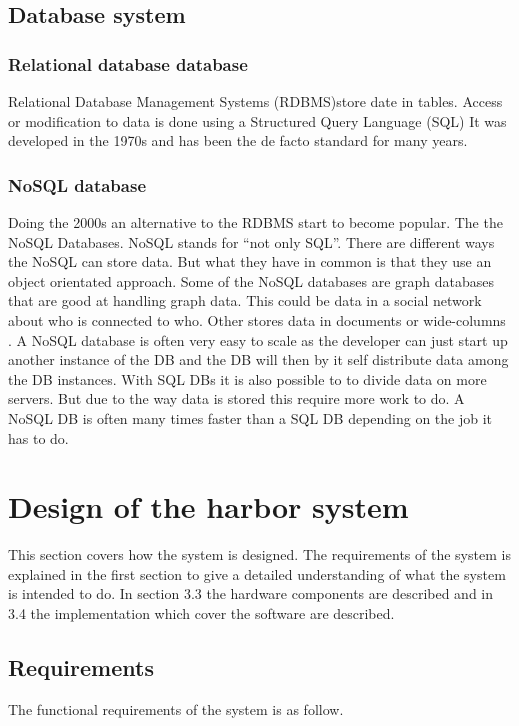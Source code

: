 \documentclass[a4paper,12pt,english]{article}
\begin{document}
\subsection{Database system}
\subsubsection{Relational database database}
Relational Database Management Systems (RDBMS)store date in tables. Access or modification to
data is done using a Structured Query Language (SQL)
It was developed in the 1970s and
has been the de facto standard for many years. 

\subsubsection{NoSQL database}
Doing the 2000s an alternative to the RDBMS start to become popular.
The the NoSQL Databases. NoSQL stands for ``not only SQL''.
There are different ways the NoSQL can store
data. But what they have in common is that they use an object orientated
approach. Some of the NoSQL databases are graph databases that are good at
handling graph data. This could be data in a social network about who is
connected to who. Other stores data in documents or wide-columns \cite{mongo}. 
A NoSQL database is often very easy to scale as the developer can just start up
another instance of the DB and the DB will then by it self distribute data among
the DB instances. With SQL DBs it is also possible to to divide data on more
servers. But due to the way data is stored this require more work to do. A NoSQL
DB is often many times faster than a SQL DB depending on the job it has to do.

\section{Design of the harbor system}
This section covers how the system is designed. The requirements of the
system is explained in the first section to give a detailed understanding of
what the system is intended to do. In section 3.3 the hardware components are
described and in 3.4 the implementation which cover the software are described.

\subsection{Requirements}
The functional requirements of the system is as follow.
\end{document}
